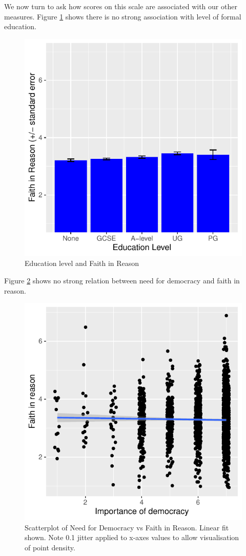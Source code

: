 \documentclass[
  ,jou,floatsintext]{apa6}
\begin{document}
We now turn to ask how scores on this scale are associated with our other measures. Figure \ref{fig:education} shows there is no strong association with level of formal education.

\begin{figure}

{\centering \includegraphics[width=0.75\linewidth]{faithinreason_files/figure-latex/education-1} 

}

\caption{Education level and Faith in Reason}\label{fig:education}
\end{figure}

Figure \ref{fig:democract} shows no strong relation between need for democracy and faith in reason.

\begin{figure}

{\centering \includegraphics[width=0.75\linewidth]{faithinreason_files/figure-latex/democract-1} 

}

\caption{Scatterplot of Need for Democracy vs Faith in Reason. Linear fit shown. Note 0.1 jitter applied to x-axes values to allow visualisation of point density.}\label{fig:democract}
\end{figure}
\end{document}

